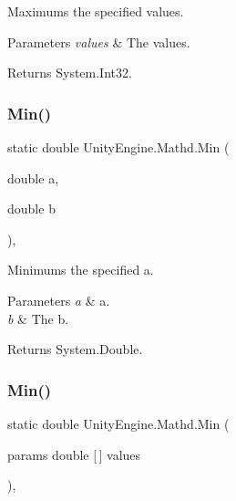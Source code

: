 Maximums the specified values. 


\begin{DoxyParams}{Parameters}
{\em values} & The values.\\
\hline
\end{DoxyParams}
\begin{DoxyReturn}{Returns}
System.\+Int32.
\end{DoxyReturn}
\mbox{\label{struct_unity_engine_1_1_mathd_afb195e2527d9c0ebe067f1cbd832ba38}} 
\subsubsection{\texorpdfstring{Min()}{Min()}\hspace{0.1cm}{\footnotesize\ttfamily [1/4]}}
{\footnotesize\ttfamily static double Unity\+Engine.\+Mathd.\+Min (\begin{DoxyParamCaption}\item[{double}]{a,  }\item[{double}]{b }\end{DoxyParamCaption})\hspace{0.3cm}{\ttfamily [inline]}, {\ttfamily [static]}}



Minimums the specified a. 


\begin{DoxyParams}{Parameters}
{\em a} & a.\\
\hline
{\em b} & The b.\\
\hline
\end{DoxyParams}
\begin{DoxyReturn}{Returns}
System.\+Double.
\end{DoxyReturn}
\mbox{\label{struct_unity_engine_1_1_mathd_a41a4668b0ccddc8afe70518098cb0c10}} 
\subsubsection{\texorpdfstring{Min()}{Min()}\hspace{0.1cm}{\footnotesize\ttfamily [2/4]}}
{\footnotesize\ttfamily static double Unity\+Engine.\+Mathd.\+Min (\begin{DoxyParamCaption}\item[{params double \mbox{[}$\,$\mbox{]}}]{values }\end{DoxyParamCaption})\hspace{0.3cm}{\ttfamily [inline]}, {\ttfamily [static]}}



